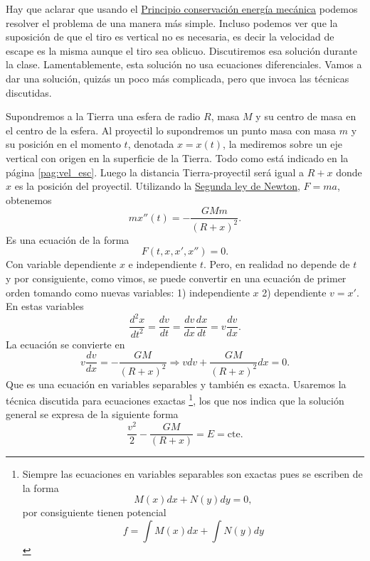 Hay que aclarar que usando el \href{https://docs.google.com/file/d/0B80iJ0HgObRRWll6MlJFSjFNMGc/edit}{Principio conservación energía mecánica} podemos resolver
el problema de una manera más simple. Incluso podemos ver que la suposición de que el tiro es vertical no es necesaria, es decir la velocidad de escape es la misma aunque
el tiro sea oblicuo. Discutiremos esa solución durante la clase. Lamentablemente,  esta solución no usa ecuaciones diferenciales.
Vamos a dar una solución, quizás un poco más complicada, pero que invoca las técnicas
discutidas.


Supondremos a la Tierra una esfera de radio $R$, masa $M$ y su centro de masa en el centro de la esfera.   Al proyectil lo supondremos un punto masa
con masa $m$ y su posición en el momento $t$, denotada $x=x(t)$, la mediremos sobre un eje vertical con origen en la superficie de la Tierra.  Todo como está indicado en la página \ref{pag:vel_esc}.
Luego la distancia Tierra-proyectil será igual a $R+x$ donde $x$ es la posición del proyectil. Utilizando la \href{http://es.wikipedia.org/wiki/Leyes_de_Newton\#Segunda_ley_de_Newton_o_ley_de_fuerza}{Segunda ley de Newton}, $F=ma$, obtenemos
\[mx''(t)=-\frac{GMm}{(R+x)^2}.\]
Es una ecuación de la forma
\[F(t,x,x',x'')=0.\]
Con variable dependiente $x$ e independiente $t$. Pero, en realidad no depende de $t$ y por consiguiente, como vimos, se puede convertir en una ecuación de primer orden
tomando como nuevas variables: 1) independiente $x$ 2) dependiente $v=x'$. En estas variables
\[\frac{d^2x}{dt^2}=\frac{dv}{dt}=\frac{dv}{dx}\frac{dx}{dt}=v\frac{dv}{dx}.\]
La ecuación se convierte en
\[v\frac{dv}{dx}=-\frac{GM}{(R+x)^2}\Longrightarrow vdv+\frac{GM}{(R+x)^2}dx=0.\]
Que es una ecuación en variables separables y también es exacta. Usaremos la técnica discutida para
ecuaciones exactas \footnote{Siempre las ecuaciones en variables separables son exactas pues se escriben de la forma
\[M(x)dx+N(y)dy=0,\]
por consiguiente tienen potencial
\[f=\int M(x)dx +\int N(y)dy\]}, los que nos indica que la solución general se expresa de la siguiente forma
\begin{equation}\label{energia}
 \frac{v^2}{2}-\frac{GM}{(R+x)}=E=\text{cte}.
\end{equation}

